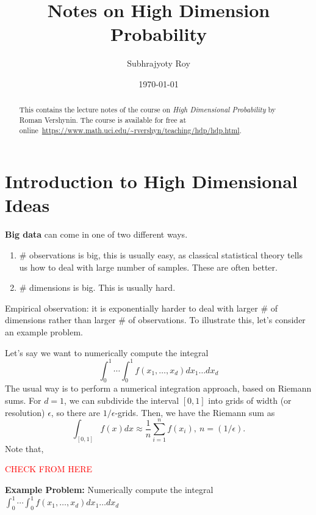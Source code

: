 \documentclass[12pt]{article}
\title{Notes on High Dimension Probability}
\author{Subhrajyoty Roy}
\date{\today}
\newcommand{\sr}[1]{\textcolor{red}{#1}}
\begin{document}
\allowdisplaybreaks
\maketitle

\begin{abstract}
    This contains the lecture notes of the course on \textit{High Dimensional Probability} by Roman Vershynin. The course is available for free at online~\url{https://www.math.uci.edu/~rvershyn/teaching/hdp/hdp.html}.
\end{abstract}


\section{Introduction to High Dimensional Ideas}

\textbf{Big data} can come in one of two different ways.
\begin{enumerate}
	\item \# observations is big, this is usually easy, as classical statistical theory tells us how to deal with large number of samples. These are often better.
	\item \# dimensions is big. This is usually hard.
\end{enumerate}

Empirical observation: it is exponentially harder to deal with larger \# of dimensions rather than larger \# of observations. To illustrate this, let's consider an example problem.

\begin{examplebox}
	Let's say we want to numerically compute the integral
	\begin{equation*} 
		\int_0^1 \cdots \int_0^1 f(x_1, \ldots, x_d) dx_1 \ldots dx_d
	\end{equation*}
	The usual way is to perform a numerical integration approach, based on Riemann sums. For $d = 1$, we can subdivide the interval $[0, 1]$ into grids of width (or resolution) $\epsilon$, so there are $1/\epsilon$-grids. Then, we have the Riemann sum as 
	\begin{equation*}
		\int_{[0, 1]} f(x)dx \approx \dfrac{1}{n}\sum_{i=1}^n f(x_i), \ n = (1/\epsilon).
	\end{equation*}
	\noindent Note that, 
\end{examplebox}

\sr{CHECK FROM HERE}



\textbf{Example Problem:} Numerically compute the integral 
$\int_0^1 \cdots \int_0^1 f(x_1, \ldots, x_d) dx_1 \ldots dx_d$
\end{document}
